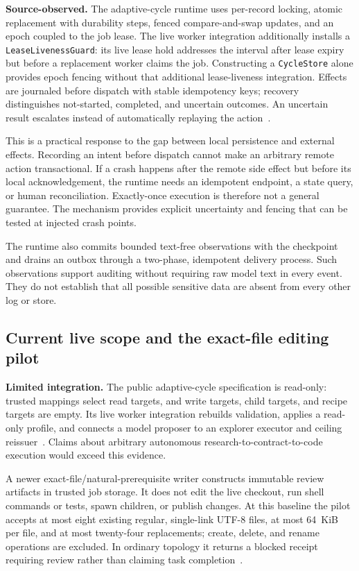 \textbf{Source-observed.} The adaptive-cycle runtime uses per-record locking, atomic replacement with durability steps, fenced compare-and-swap updates, and an epoch coupled to the job lease. The live worker integration additionally installs a \texttt{LeaseLivenessGuard}: its live lease hold addresses the interval after lease expiry but before a replacement worker claims the job. Constructing a \texttt{CycleStore} alone provides epoch fencing without that additional lease-liveness integration. Effects are journaled before dispatch with stable idempotency keys; recovery distinguishes not-started, completed, and uncertain outcomes. An uncertain result escalates instead of automatically replaying the action~\cite{ref23}.

This is a practical response to the gap between local persistence and external effects. Recording an intent before dispatch cannot make an arbitrary remote action transactional. If a crash happens after the remote side effect but before its local acknowledgement, the runtime needs an idempotent endpoint, a state query, or human reconciliation. Exactly-once execution is therefore not a general guarantee. The mechanism provides explicit uncertainty and fencing that can be tested at injected crash points.

The runtime also commits bounded text-free observations with the checkpoint and drains an outbox through a two-phase, idempotent delivery process. Such observations support auditing without requiring raw model text in every event. They do not establish that all possible sensitive data are absent from every other log or store.

\subsection{Current live scope and the exact-file editing pilot}

\textbf{Limited integration.} The public adaptive-cycle specification is read-only: trusted mappings select read targets, and write targets, child targets, and recipe targets are empty. Its live worker integration rebuilds validation, applies a read-only profile, and connects a model proposer to an explorer executor and ceiling reissuer~\cite{ref24}. Claims about arbitrary autonomous research-to-contract-to-code execution would exceed this evidence.

A newer exact-file/natural-prerequisite writer constructs immutable review artifacts in trusted job storage. It does not edit the live checkout, run shell commands or tests, spawn children, or publish changes. At this baseline the pilot accepts at most eight existing regular, single-link UTF-8 files, at most 64~KiB per file, and at most twenty-four replacements; create, delete, and rename operations are excluded. In ordinary topology it returns a blocked receipt requiring review rather than claiming task completion~\cite{ref25}.

